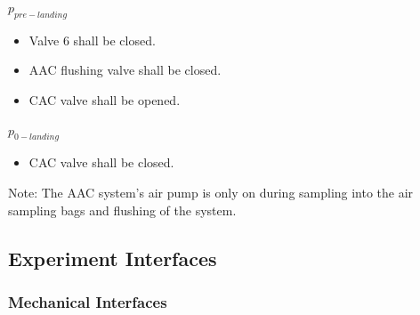 \documentclass[a4paper,12pt,oneside]{article}
\begin{document}
$p_{pre-landing}$ 
\begin{itemize}
    \item Valve 6 shall be closed.
    \item AAC flushing valve shall be closed.
    \item CAC valve shall be opened.
\end{itemize}

$p_{0-landing}$
\begin{itemize}
    \item CAC valve shall be closed.
\end{itemize}


Note: The AAC system's air pump is only on during sampling into the air sampling bags and flushing of the system.


\raggedbottom
\pagebreak
\subsection{Experiment Interfaces}

\subsubsection{Mechanical Interfaces}
\label{sec:4.2.1}
\end{document}

